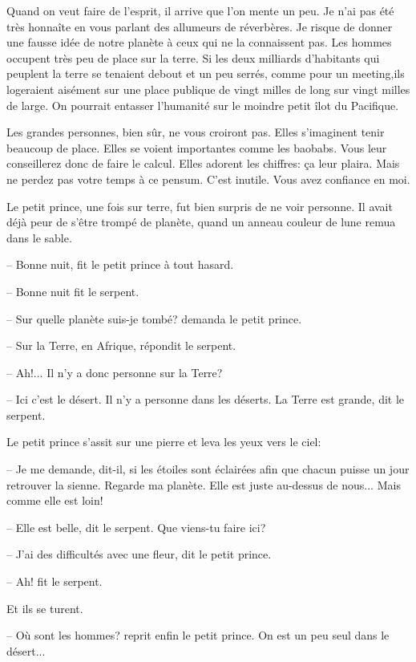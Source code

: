 \documentclass[a4paper]{report}
\begin{document}

\parachapter{} %
Quand on veut faire de l'esprit, il arrive que l'on mente un peu. Je n'ai pas été très honnaîte en vous parlant des allumeurs de réverbères. Je risque de donner une fausse idée de notre planète à ceux qui ne la connaissent pas. Les hommes occupent très peu de place sur la terre. Si les deux milliards d'habitants qui peuplent la terre se tenaient debout et un peu serrés, comme pour un meeting,ils logeraient aisément sur une place publique de vingt milles de long sur vingt milles de large. On pourrait entasser l'humanité sur le moindre petit îlot du Pacifique.

Les grandes personnes, bien sûr, ne vous croiront pas. Elles s'imaginent tenir beaucoup de place. Elles se voient importantes comme les baobabs. Vous leur conseillerez donc de faire le calcul. Elles adorent les chiffres: ça leur plaira. Mais ne perdez pas votre temps à ce pensum. C'est inutile. Vous avez confiance en moi.

Le petit prince, une fois sur terre, fut bien surpris de ne voir personne. Il avait déjà peur de s'être trompé de planète, quand un anneau couleur de lune remua dans le sable.

-- Bonne nuit, fit le petit prince à tout hasard.

-- Bonne nuit fit le serpent.

-- Sur quelle planète suis-je tombé? demanda le petit prince.

-- Sur la Terre, en Afrique, répondit le serpent.

-- Ah!... Il n'y a donc personne sur la Terre?

-- Ici c'est le désert. Il n'y a personne dans les déserts. La Terre est grande, dit le serpent.

Le petit prince s'assit sur une pierre et leva les yeux vers le ciel:

-- Je me demande, dit-il, si les étoiles sont éclairées afin que chacun puisse un jour retrouver la sienne. Regarde ma planète. Elle est juste au-dessus de nous... Mais comme elle est loin!

-- Elle est belle, dit le serpent. Que viens-tu faire ici?

-- J'ai des difficultés avec une fleur, dit le petit prince.

-- Ah! fit le serpent.

Et ils se turent.

-- Où sont les hommes? reprit enfin le petit prince. On est un peu seul dans le désert...
\end{document}
